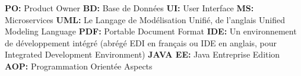 \thispagestyle{empty}
\begin{center}
\end{center}
\vspace{0.8cm}
\textbf{PO:} Product Owner
\newline
\textbf{BD:} Base de Données
\newline
\textbf{UI:} User Interface
\newline
\textbf{MS:} Microservices
\newline
\textbf{UML:} Le Langage de Modélisation Unifié, de l'anglais Unified Modeling Language
\newline
\textbf{PDF:} Portable Document Format
\newline
\textbf{IDE:} Un environnement de développement intégré (abrégé EDI en français ou IDE en anglais, pour Integrated Development Environment)
\newline
\textbf{JAVA EE:} Java Entreprise Edition
\newline
\textbf{AOP:} Programmation Orientée Aspects
\newline
